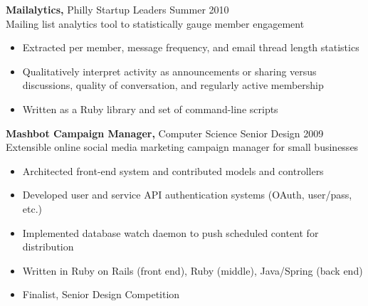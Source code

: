 \documentclass[margin]{res}
\begin{document}
\begin{resume}
\begin{software}
{\bf Mailalytics,} Philly Startup Leaders \hfill  Summer 2010 \\
Mailing list analytics tool to statistically gauge member engagement
\begin{itemize} \itemsep -2pt %
\item Extracted per member, message frequency, and email thread length statistics
\item Qualitatively interpret activity as announcements or sharing versus discussions, quality of conversation, and regularly active membership
\item Written as a Ruby library and set of command-line scripts
\end{itemize}
\end{software}
%
\begin{general}
 {\bf Mashbot Campaign Manager,} Computer Science Senior Design \hfill 2009 \\
Extensible online social media marketing campaign manager for small businesses
 \begin{itemize} \itemsep -2pt  %
 \item Architected front-end system and contributed models and controllers
 \item Developed user and service API authentication systems (OAuth, user/pass, etc.)
 \item Implemented database watch daemon to push scheduled content for distribution
 \item Written in Ruby on Rails (front end), Ruby (middle), Java/Spring (back end)
 \item Finalist, Senior Design Competition
 \end{itemize}
\end{general}


\end{resume}
\end{document}
